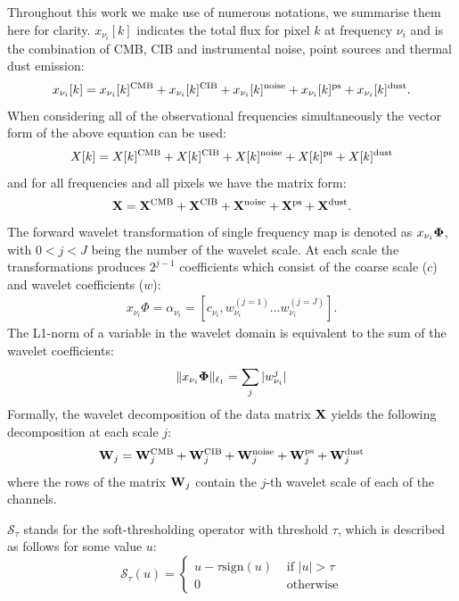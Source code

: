 \documentclass[a4paper,fleqn,usenatbib]{mnras}
\begin{document}
Throughout this work we make use of numerous notations, we summarise them here for clarity. $x_{\nu_{i}}[k]$ indicates the total flux for pixel $k$ at frequency $\nu_{i}$ and is the combination of CMB, CIB and instrumental noise, point sources and thermal dust emission:
\begin{equation}
x_{\nu_{i}}[k] = x_{\nu_{i}}[k] ^{\rm{CMB}} + x_{\nu_{i}}[k] ^{\rm{CIB}} + x_{\nu_{i}}[k] ^{\rm{noise}} + x_{\nu_{i}}[k] ^{\rm{ps}} + x_{\nu_{i}}[k] ^{\rm{dust}}.
\end{equation}  
When considering all of the observational frequencies simultaneously the vector form of the above equation can be used:
\begin{equation}
X[k] = X[k] ^{\rm{CMB}} + X[k] ^{\rm{CIB}} + X[k] ^{\rm{noise}}  + X[k] ^{\rm{ps}} + X[k] ^{\rm{dust}}
\end{equation}  
and for all frequencies and all pixels we have the matrix form:
\begin{eqnarray}
{\bf{X}} = {\bf{X}} ^{\rm{CMB}} + {\bf{X}} ^{\rm{CIB}} + {\bf{X}} ^{\rm{noise}} + {\bf{X}} ^{\rm{ps}} + {\bf{X}}^{\rm{dust}}.
\end{eqnarray} 
The forward wavelet transformation of single frequency map is denoted as  $x_{\nu_{i}} {\bf{\Phi}}$, with $0 < j < J$ being the number of the wavelet scale. At each scale the transformations produces $2^{j-1}$ coefficients which consist of the coarse scale ($c$) and wavelet coefficients ($w$):
\begin{eqnarray}
x_{\nu_{i}} \Phi  = \alpha_{\nu_{i}} = [c_{\nu_{i}}, w_{\nu_{i}}^{(j=1)} ... w_{\nu_{i}}^{(j=J)}].
\end{eqnarray}
The L1-norm of a variable in the wavelet domain is equivalent to the sum of the wavelet coefficients:
\begin{eqnarray}
 \| x_{\nu_{i}} {\bf \Phi}\|_{\ell_1} = \sum_j | w_{\nu_{i}}^{  j}|
\end{eqnarray}
Formally, the wavelet decomposition of the data matrix $\bf X$ yields the following decomposition at each scale $j$:
\begin{eqnarray}
{\bf W}_j = {\bf W}_j^{\rm{CMB}} + {\bf W}_j^{\rm{CIB}} + {\bf W}_j ^{\rm{noise}}  +  {\bf W}_j ^{\rm{ps}} +  {\bf W}_j^{\rm{dust}}
\end{eqnarray}
where the rows of the matrix ${\bf W}_j$ contain the $j$-th wavelet scale of each of the channels. 

$\mathcal{S}_{\tau}$ stands for the soft-thresholding operator with threshold $\tau$, which is described as follows for some value $u$:
\begin{equation}
\mathcal{S}_{\tau}(u) = \left \{
\begin{array}{ll}
u - \tau \mbox{sign}(u) & \mbox{ if } |u| > \tau \\
0 & \mbox{ otherwise}
\end{array}
\right.
\end{equation}
\end{document}

